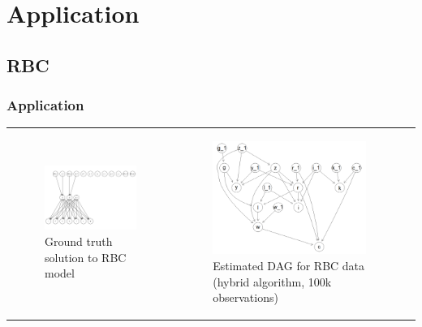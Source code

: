 \documentclass{beamer}
\begin{document}
\section{Application}
\subsection{RBC}
\begin{frame}
    \frametitle{Application}
    \begin{tabular}{ p{5cm} p{5cm} }
        \begin{figure}
            \centering
            \includegraphics[width=5cm]{images/rbc_true_dag.png}
            \caption{Ground truth solution to RBC model}
            \label{dag4}
          \end{figure}
        &
        \begin{figure}
            \centering
            \includegraphics[width=5cm]{images/rbc_hybrid_structure.png}
            \caption{Estimated DAG for RBC data (hybrid algorithm, 100k observations)}
            \label{dag5}
          \end{figure}
    \end{tabular}
\end{frame}
\end{document}
